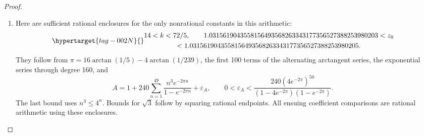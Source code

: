 \begin{proof}
\begin{enumerate}[label=\arabic*.,leftmargin=*]
\item Here are sufficient rational enclosures for the only nonrational
constants in this arithmetic:
\begin{equation}\hypertarget{tag-002N}{}\label{ari:eq:cc-constants}
 \begin{gathered}
 14<k<72/5,\qquad
 1.0315619043558156493568263343177356527388253980203
 <z_0\\
 <1.0315619043558156493568263343177356527388253980205.
 \end{gathered}
\end{equation}
They follow from
$\pi=16\arctan(1/5)-4\arctan(1/239)$, the first 100 terms
of the alternating arctangent series, the exponential series
through degree 160, and
\[
 A=1+240\sum_{n=1}^{49}\frac{n^3e^{-2\pi n}}{1-e^{-2\pi n}}
       +\varepsilon_A,\qquad
 0<\varepsilon_A<
 \frac{240(4e^{-2\pi})^{50}}
 {(1-4e^{-2\pi})(1-e^{-2\pi})}.
\]
The last bound uses $n^3\le4^n$. Bounds for $\sqrt3$ follow
by squaring rational endpoints. All ensuing coefficient
comparisons are rational arithmetic using these enclosures.


\end{enumerate}
\end{proof}

